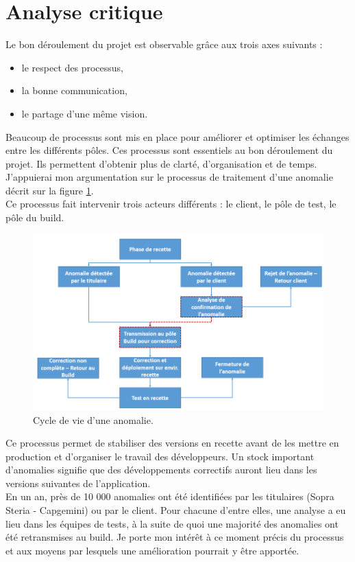 \documentclass[12pt,a4paper]{article}
\begin{document}
\section{Analyse critique}
Le bon déroulement du projet est observable grâce aux trois axes suivants :
\smallbreak
\begin{itemize}
\item le respect des processus,
\item la bonne communication,
\item le partage d'une même vision.
\end{itemize}
\medbreak
Beaucoup de processus sont mis en place pour améliorer et optimiser les échanges entre les différents pôles. Ces processus sont essentiels au bon déroulement du projet. Ils permettent d'obtenir plus de clarté, d'organisation et de temps. J'appuierai mon argumentation sur le processus de traitement d'une anomalie décrit sur la figure \ref{cycleVieAnomalie}.\\
Ce processus fait intervenir trois acteurs différents : le client, le pôle de test, le pôle du build. 
\begin{figure}[!hp]
		\begin{center}
			\includegraphics[width=1.1\textwidth,keepaspectratio]{cycleAnomalie2.png}
			\caption{Cycle de vie d'une anomalie.}
			\label{cycleVieAnomalie}
		\end{center}
\end{figure}
\clearpage
\newpage
Ce processus permet de stabiliser des versions en recette avant de les mettre en production et d'organiser le travail des développeurs. Un stock important d'anomalies signifie que des développements correctifs auront lieu dans les versions suivantes de l'application.\\
En un an, près de 10 000 anomalies ont été identifiées par les titulaires (Sopra Steria - Capgemini) ou par le client. Pour chacune d'entre elles, une analyse a eu lieu dans les équipes de tests, à la suite de quoi une majorité des anomalies ont été retransmises au build. Je porte mon intérêt à ce moment précis du processus et aux moyens par lesquels une amélioration pourrait y être apportée.\\
\end{document}
